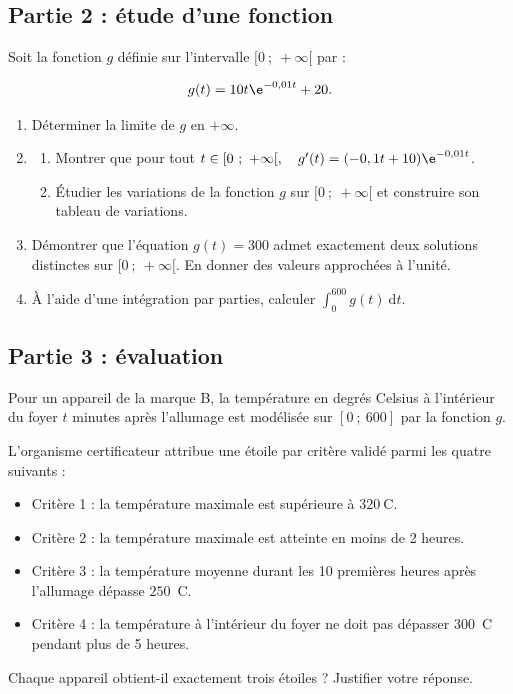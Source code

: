 \subsection*{Partie 2 : étude d'une fonction}
Soit la fonction $g$ définie sur l'intervalle $[0~;~+ \infty[ $ par :

\[g(t) = 10 t \e^{-0,01 t} + 20.\]

\begin{enumerate}
	\item Déterminer la limite de $g$ en $+ \infty$.
	\item \begin{enumerate}
		\item Montrer que pour tout $t \in [0~;~+ \infty[,\quad g'(t)=(-0,1 t + 10) \e^{- 0,01 t}$.
		\item Étudier les variations de la fonction $g$ sur $[0~;~+ \infty[$ et construire son tableau de variations.
	\end{enumerate}
	\item Démontrer que l'équation $g(t) = 300$ admet exactement deux solutions distinctes sur [$0~;~+ \infty[$. En donner des valeurs approchées à l'unité.
	\item À l'aide d'une intégration par parties, calculer \quad $\displaystyle \int_{0}^{600} g(t) \:\text{d}t$.
\end{enumerate}

\subsection*{Partie 3 : évaluation}
Pour un appareil de la marque B, la température en degrés Celsius à l'intérieur du foyer $t$ minutes après l'allumage est modélisée sur $[0~;~600]$ par la fonction $g$.

L'organisme certificateur attribue une étoile par critère validé parmi les quatre suivants :

\begin{itemize}
\item Critère 1 : la température maximale est supérieure à $320~$\degres C.
\item Critère 2 : la température maximale est atteinte en moins de 2 heures.
\item Critère 3 : la température moyenne durant les 10 premières heures après l'allumage dépasse $250$~\degres C.
\item Critère 4 : la température à l'intérieur du foyer ne doit pas dépasser $300$~\degres C pendant plus de 5 heures.
\end{itemize}

Chaque appareil obtient-il exactement trois étoiles ? Justifier votre réponse.

